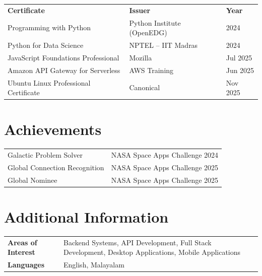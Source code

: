 \documentclass[a4paper,10pt]{article}
\begin{document}
\renewcommand{\arraystretch}{1.05}
\begin{tabular}{@{} p{7.8cm} p{6.5cm} p{2.5cm} @{}}
\textbf{Certificate}                  & \textbf{Issuer}              & \textbf{Year} \\[1pt]
Programming with Python               & Python Institute (OpenEDG)   & 2024 \\
Python for Data Science               & NPTEL -- IIT Madras          & 2024 \\
JavaScript Foundations Professional   & Mozilla                      & Jul 2025 \\
Amazon API Gateway for Serverless     & AWS Training                 & Jun 2025 \\
Ubuntu Linux Professional Certificate & Canonical                    & Nov 2025 \\
\end{tabular}

\section*{Achievements}

\begin{tabular}{@{} p{9.5cm} p{8cm} @{}}
Galactic Problem Solver              & NASA Space Apps Challenge 2024 \\
Global Connection Recognition        & NASA Space Apps Challenge 2025 \\
Global Nominee                       & NASA Space Apps Challenge 2025 \\
\end{tabular}

\section*{Additional Information}

\begin{tabular}{@{} >{\bfseries}p{3.8cm} p{13cm} @{}}
Areas of Interest & Backend Systems, API Development, Full Stack Development, Desktop Applications, Mobile Applications \\
Languages         & English, Malayalam \\
\end{tabular}

\vspace{3pt}
\end{document}
